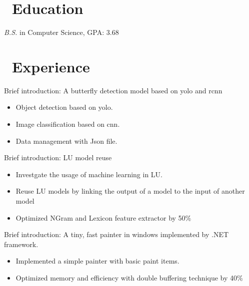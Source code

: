 \documentclass{resume}
\begin{document}



\section{\faGraduationCap\ Education}
\textit{B.S.} in Computer Science, GPA: 3.68

\section{\faUsers\ Experience}

Brief introduction: A butterfly detection model based on yolo and rcnn
\begin{itemize}
  \item Object detection based on yolo.
  \item Image classification based on cnn.
	\item Data management with Json file.
\end{itemize}


Brief introduction: LU model reuse
\begin{itemize}
	\item Investgate the usage of machine learning in LU.
  \item Reuse LU models by linking the output of a model to the input of another model
  \item Optimized NGram and Lexicon feature extractor by 50\%
\end{itemize}

Brief introduction: A tiny, fast painter in windows implemented by .NET framework.
\begin{itemize}
  \item Implemented a simple painter with basic paint items.
  \item Optimized memory and efficiency with double buffering technique by 40\%
\end{itemize}
\end{document}
